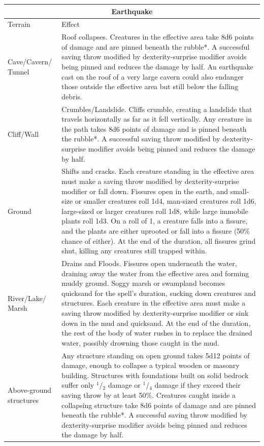 \noindent
\begin{tabular}{|p{}|p{}|}
\multicolumn{2}{c}{Earthquake} \\
\hline
Terrain	& Effect \\
\hline\hline
\rowcolor[gray]{.9}Cave/Cavern/ Tunnel	& Roof collapses.  Creatures in the effective area take 8d6 points of damage and are pinned beneath the rubble*.  A successful saving throw modified by dexterity-surprise modifier avoids being pinned and reduces the damage by half.  An earthquake cast on the roof of a very large cavern could also endanger those outside the effective area but still below the falling debris. \\
Cliff/Wall	& Crumbles/Landslide. Cliffs crumble, creating a landslide that travels horizontally as far as it fell vertically.  Any creature in the path takes 8d6 points of damage and is pinned beneath the rubble*.  A successful saving throw modified by dexterity-surprise modifier avoids being pinned and reduces the damage by half. \\
\rowcolor[gray]{.9}Ground	& Shifts and cracks.  Each creature standing in the effective area must make a saving throw modified by dexterity-surprise modifier or fall down.  Fissures open in the earth, and small-size or smaller creatures roll 1d4, man-sized creatures roll 1d6, large-sized or larger creatures roll 1d8, while large immobile plants roll 1d3.  On a roll of 1, a creature falls into a fissure, and the plants are either uprooted or fall into a fissure (50\% chance of either).  At the end of the duration, all fissures grind shut, killing any creatures still trapped within.  \\
River/Lake/ Marsh	& Drains and Floods. Fissures open underneath the water, draining away the water from the effective area and forming muddy ground. Soggy marsh or swampland becomes quicksand for the spell's duration, sucking down creatures and structures. Each creature in the effective area must make a saving throw modified by dexterity-surprise modifier or sink down in the mud and quicksand.  At the end of the duration, the rest of the body of water rushes in to replace the drained water, possibly drowning those caught in the mud.  \\
\rowcolor[gray]{.9}Above-ground structures		& Any structure standing on open ground takes 5d12 points of damage, enough to collapse a typical wooden or masonry building.  Structures with foundations built on solid bedrock suffer only $^1$/$_2$ damage or $^1$/$_4$ damage if they exceed their saving throw by at least 50\%.  Creatures caught inside a collapsing structure take 8d6 points of damage and are pinned beneath the rubble*.  A successful saving throw modified by dexterity-surprise modifier avoids being pinned and reduces the damage by half. \\
\hline
\end{tabular}

